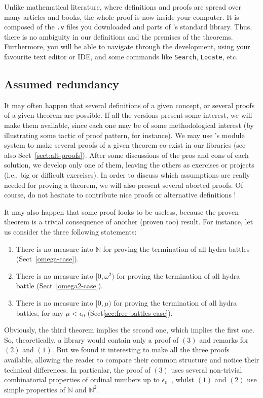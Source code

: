 \documentclass[a4paper]{book}
\begin{document}
Unlike mathematical literature, where definitions and proofs are spread over many articles and books,
the whole proof is now inside your computer. It is composed of the \texttt{.v} files you downloaded and 
parts of \coq's standard library. Thus, there is no ambiguity in our definitions and the premises of the theorems. Furthermore, you will be able to navigate through the development, using your favourite text editor or IDE, and some commands like \texttt{Search}, \texttt{Locate},  etc.



\subsection{Assumed redundancy}

It may often happen that several definitions of a given concept, or several proofs of a given theorem are possible. If all the versions present some interest, we will make them available, since each one may be of some methodological 
interest (by illustrating some tactic of proof pattern, for instance).
We may use \coq's module system to make several proofs of a given theorem co-exist in our libraries (see also Sect~\vref{sect:alt-proofs}).
After some discussions of the pros and cons of each solution, we develop only one of them, leaving the others  as exercises or projects (i.e., big or difficult exercises).
In order to discuss which assumptions are really needed for proving a theorem, we will also present 
several aborted proofs.
Of course, do not hesitate to contribute nice proofs or alternative definitions !

It may also happen that some proof looks to be useless, because the proven theorem is a trivial consequence of another (proven too) result.
For instance, let us consider the three following statements:
\begin{enumerate}
\item There is no measure into $\mathbb{N}$ for proving the termination of all hydra battles (Sect~\vref{omega-case}).
\item There is no measure into $[0,\omega^2)$ for proving the termination of all hydra battle (Sect~\vref{omega2-case}).
\item There is no measure into $[0,\mu)$ for proving the termination of all hydra battles, for any $\mu<\epsilon_0$ (Sect\vref{sec:free-battles-case}).
\end{enumerate}

Obviously, the third theorem implies the second one, which implies the first one. So, theoretically, a library would contain only a proof of $(3)$ and remarks for $(2)$ and $(1)$. But we found it interesting to make all the three proofs available, allowing the reader to compare their common structure and notice their technical differences.
In particular, the proof of $(3)$ uses several non-trivial combinatorial properties of ordinal numbers up to $\epsilon_0$~\cite{KS81}, whilst $(1)$ and $(2)$ use simple properties of $\mathbb{N}$ and $\mathbb{N}^2$.
\end{document}
